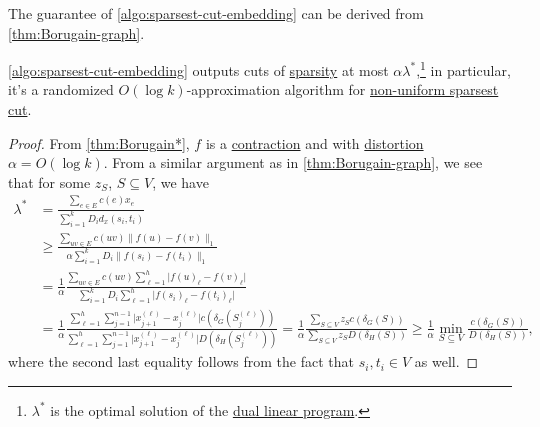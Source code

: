 The guarantee of \autoref{algo:sparsest-cut-embedding} can be derived from \autoref{thm:Borugain-graph}.

\begin{theorem}\label{thm:sparsest-cut-embedding}
	\autoref{algo:sparsest-cut-embedding} outputs cuts of \hyperref[def:sparsity]{sparsity} at most \(\alpha \lambda ^{\ast} \),\footnote{\(\lambda ^{\ast} \) is the optimal solution of the \hyperref[eq:non-uniform-sparsest-cut-LP-dual]{dual linear program}.} in particular, it's a randomized \(O(\log k)\)-approximation algorithm for \hyperref[prb:non-uniform-sparsest-cut]{non-uniform sparsest cut}.
\end{theorem}
\begin{proof}
	From \autoref{thm:Borugain*}, \(f\) is a \hyperref[def:contraction]{contraction} and with \hyperref[def:distortion]{distortion} \(\alpha = O(\log k)\). From a similar argument as in \autoref{thm:Borugain-graph}, we see that for some \(z_S\), \(S \subseteq V\), we have
	\[
		\begin{split}
			\lambda ^{\ast}
			 & = \frac{\sum_{e \in E} c(e) x_e}{\sum_{i=1}^{k} D_i d_x(s_i, t_i)}                                                                                                                                                                                            \\
			 & \geq \frac{\sum_{uv \in E} c(uv) \lVert f(u) - f(v) \rVert _1}{\alpha \sum_{i=1}^{k} D_i \lVert f(s_i) - f(t_i) \rVert _1}                                                                                                                                    \\
			 & = \frac{1}{\alpha } \frac{\sum_{uv \in E} c(uv) \sum_{\ell =1}^{h} \lvert f(u)_{\ell } - f(v) _\ell  \rvert }{\sum_{i=1}^{k} D_i \sum_{\ell =1}^{h} \lvert f(s_i)_{\ell } - f(t_i)_{\ell }  \rvert }                                                          \\
			 & = \frac{1}{\alpha } \frac{\sum_{\ell =1}^{h} \sum_{j=1}^{n-1} \lvert x_{j+1}^{(\ell )} - x_{j}^{(\ell )}\rvert c(\delta _G(S_j^{(\ell )}))}{\sum_{\ell =1}^{h} \sum_{j=1}^{n-1} \lvert x_{j+1}^{(\ell )} - x_{j}^{(\ell )}\rvert D(\delta _H(S_j^{(\ell )}))}
			= \frac{1}{\alpha } \frac{\sum_{S \subseteq V} z_S c(\delta _G(S))}{\sum_{S \subseteq V} z_S D(\delta _H(S))}
			\geq \frac{1}{\alpha } \min _{S \subseteq V} \frac{c(\delta _G(S))}{D(\delta _H(S))},
		\end{split}
	\]
	where the second last equality follows from the fact that \(s_i, t_i \in V\) as well.
\end{proof}

